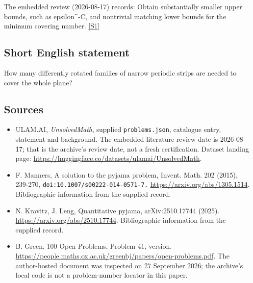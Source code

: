 \documentclass[11pt,a4paper]{article}
\newcommand{\sref}[2]{\hyperlink{source:#1:#2}{[S#2]}}
\begin{document}
The embedded review (2026-08-17) records: Obtain substantially smaller upper bounds, such as epsilon\textasciicircum{}{-C}, and nontrivial matching lower bounds for the minimum covering number. \sref{statement}{1}

\subsection{Short English statement}

How many differently rotated families of narrow periodic strips are needed to cover the whole plane?

\subsection{Sources}

{\small

\begin{itemize}

\item[\hypertarget{source:statement:1}{S1}] ULAM.AI, \emph{UnsolvedMath}, supplied \texttt{problems.json}, catalogue entry, statement and background. The embedded literature-review date is 2026-08-17; that is the archive’s review date, not a fresh certification. Dataset landing page: \url{https://huggingface.co/datasets/ulamai/UnsolvedMath}.

\item[\hypertarget{source:statement:2}{S2}] F. Manners, A solution to the pyjama problem, Invent. Math. 202 (2015), 239-270, \nolinkurl{doi:10.1007/s00222-014-0571-7.} \url{https://arxiv.org/abs/1305.1514}. Bibliographic information from the supplied record.

\item[\hypertarget{source:statement:3}{S3}] N. Kravitz, J. Leng, Quantitative pyjama, arXiv:2510.17744 (2025). \url{https://arxiv.org/abs/2510.17744}. Bibliographic information from the supplied record.

\item[\hypertarget{source:statement:4}{S4}] B. Green, 100 Open Problems, Problem 41, version. \url{https://people.maths.ox.ac.uk/greenbj/papers/open-problems.pdf}. The author-hosted document was inspected on 27 September 2026; the archive’s local code is not a problem-number locator in this paper.

\end{itemize}

}

\label{end:statement}
\end{document}
